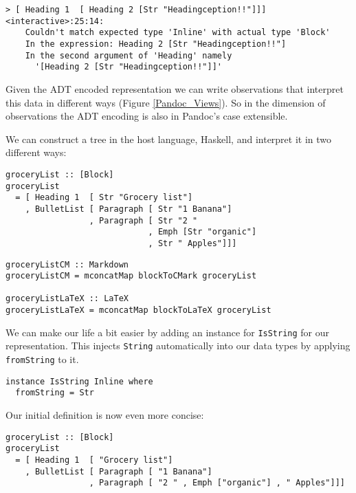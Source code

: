 \begin{lstlisting}
> [ Heading 1  [ Heading 2 [Str "Headingception!!"]]]
<interactive>:25:14:
    Couldn't match expected type 'Inline' with actual type 'Block'
    In the expression: Heading 2 [Str "Headingception!!"]
    In the second argument of 'Heading' namely
      '[Heading 2 [Str "Headingception!!"]]'
\end{lstlisting}

Given the ADT encoded representation we can write observations that interpret
this data in different ways (Figure \ref{Pandoc_Views}). So in the dimension of
observations the ADT encoding is also in Pandoc’s case extensible.

We can construct a tree in the host language, Haskell, and interpret it in two
different ways:
\begin{lstlisting}
groceryList :: [Block]
groceryList
  = [ Heading 1  [ Str "Grocery list"]
    , BulletList [ Paragraph [ Str "1 Banana"]
                 , Paragraph [ Str "2 "
                             , Emph [Str "organic"]
                             , Str " Apples"]]]
\end{lstlisting}

\begin{lstlisting}
groceryListCM :: Markdown
groceryListCM = mconcatMap blockToCMark groceryList

groceryListLaTeX :: LaTeX
groceryListLaTeX = mconcatMap blockToLaTeX groceryList
\end{lstlisting}

We can make our life a bit easier by adding an instance for \texttt{IsString}
for our representation. This injects \texttt{String} automatically into our data
types by applying \texttt{fromString} to it.

\begin{lstlisting}
instance IsString Inline where
  fromString = Str
\end{lstlisting}


Our initial definition is now even more concise:

\begin{lstlisting}
groceryList :: [Block]
groceryList
  = [ Heading 1  [ "Grocery list"]
    , BulletList [ Paragraph [ "1 Banana"]
                 , Paragraph [ "2 " , Emph ["organic"] , " Apples"]]]
\end{lstlisting}

